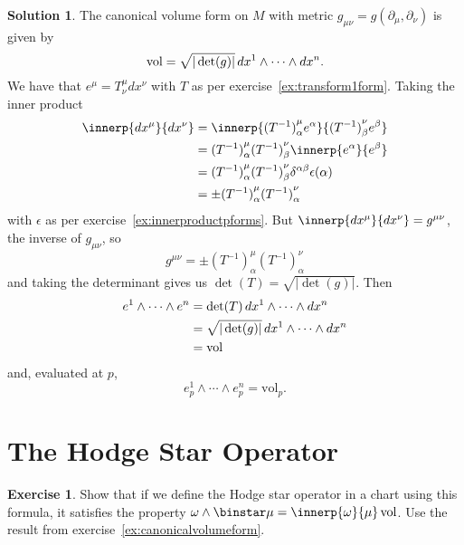 \documentclass[11pt, a4paper]{report}
\theoremstyle{definition}
\newtheorem{exercise}{Exercise}[part]
\newtheorem{solution}{Solution}[part]
\newenvironment{ex}{\begin{exercise}}{\end{exercise}\pagebreak[1]}
\newenvironment{sol}{\begin{solution}}{\end{solution}\pagebreak[3]}
\renewcommand*{\d}{\ensuremath\mathop{}\mathopen{}d}
\renewcommand*{\star}{\ensuremath\mathop{}\mathopen\binstar\mathord{}}
\begin{document}
\begin{sol}

The canonical volume form on $M$ with metric $g_{\mu\nu} = g(\partial_\mu, \partial_\nu)$ is given by
\[
    \text{vol} = \sqrt{|\det(g)|} \d x^1 \wedge \cdots \wedge dx^n.
\]
We have that $e^\mu = T^\mu_\nu dx^\nu$ with $T$ as per exercise~\ref{ex:transform1form}. Taking the inner product
\begin{align*}
    \innerp{dx^\mu}{dx^\nu} &= \innerp{{(T^{-1})}^\mu_\alpha e^\alpha}{{(T^{-1})}^\nu_\beta e^\beta} \\
        &= {(T^{-1})}^\mu_\alpha {(T^{-1})}^\nu_\beta \innerp{e^\alpha}{e^\beta} \\
        &= {(T^{-1})}^\mu_\alpha {(T^{-1})}^\nu_\beta \delta^{\alpha\beta} \epsilon(\alpha) \\
        &= \pm {(T^{-1})}^\mu_\alpha {(T^{-1})}^\nu_\alpha
\end{align*}
with $\epsilon$ as per exercise~\ref{ex:innerproductpforms}.
But $\innerp{dx^\mu}{dx^\nu} = g^{\mu\nu}$, the inverse of $g_{\mu\nu}$, so
\[
g^{\mu\nu} = \pm {(T^{-1})}^\mu_\alpha {(T^{-1})}^\nu_\alpha
\]
and taking the determinant gives us $\det(T) = \sqrt{|\det(g)|}$. Then
\begin{align*}
    e^1 \wedge \cdots \wedge e^n &= \det(T) \d x^1 \wedge \cdots \wedge dx^n \\
        &= \sqrt{|\det(g)|} \d x^1 \wedge \cdots \wedge dx^n \\
        &= \text{vol}
\end{align*}
and, evaluated at $p$,
\[
e_p^1 \wedge \cdots \wedge e_p^n = \text{vol}_p.
\]

\end{sol}

\section{The Hodge Star Operator}

\begin{ex}

Show that if we define the Hodge star operator in a chart using this formula, it satisfies the property $\omega \wedge \star \mu = \innerp{\omega}{\mu} \, \text{vol}$. Use the result from exercise~\ref{ex:canonicalvolumeform}.

\end{ex}
\end{document}
